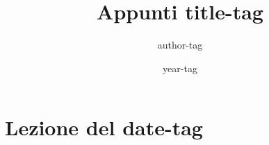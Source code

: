 \documentclass[a4paper,11pt]{article}
\title{Appunti title-tag}
\author{author-tag}
\date{year-tag}
\begin{document}
\section{Lezione del date-tag}

\thispagestyle{empty}
\pagestyle{fancy}

\end{document}

